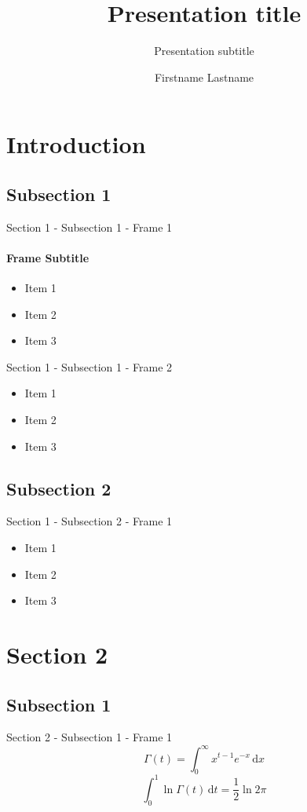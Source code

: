 \documentclass[handout,compress,xcolor={dvipsnames,table},aspectratio=1610]{beamer}
\title{Presentation title}
\subtitle{Presentation subtitle}
\author{Firstname Lastname}
\institute{Faculty, centre or unit}
\begin{document}
  \begin{frame}[plain,b]
    \titlepage
  \end{frame}

  \section{Introduction}
  \subsection{Subsection 1}
  \begin{frame}{Section 1 - Subsection 1 - Frame 1}
    \framesubtitle{Frame Subtitle}
    \begin{itemize}
      \item Item 1
      \item Item 2
      \item Item 3
    \end{itemize}
  \end{frame}
  \begin{frame}{Section 1 - Subsection 1 - Frame 2}
    \begin{itemize}
      \item Item 1
      \item Item 2
      \item Item 3
    \end{itemize}
  \end{frame}
  \subsection{Subsection 2}
  \begin{frame}{Section 1 - Subsection 2 - Frame 1}
    \begin{itemize}
      \item Item 1
      \item Item 2
      \item Item 3
    \end{itemize}
  \end{frame}

  \section{Section 2}
  \subsection{Subsection 1}
  \begin{frame}{Section 2 - Subsection 1 - Frame 1}
    $$\Gamma(t) = \int_0^\infty x^{t-1} e^{-x}\, \mathrm{d} x$$
    $$\int_0^1 \ln \Gamma(t)\, \mathrm{d} t = \frac{1}{2}\ln 2\pi$$
  \end{frame}
\end{document}
